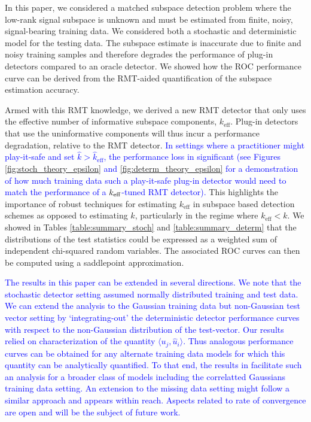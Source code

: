 In this paper, we considered a matched subspace detection problem where the low-rank signal subspace is unknown and must be estimated from finite, noisy, signal-bearing training data. We considered both a stochastic and deterministic model for the testing data. The subspace estimate is inaccurate due to finite and noisy training samples and therefore degrades the performance of plug-in detectors compared to an oracle detector. We showed how the ROC performance curve can be derived from the RMT-aided quantification of the subspace estimation accuracy.

Armed with this RMT knowledge, we derived a new RMT detector that only uses the effective number of informative subspace components, $k_\text{eff}$. Plug-in detectors that use the uninformative components will thus incur a performance degradation, relative to the RMT detector. \textcolor{blue}{In settings where a practitioner might play-it-safe and set $\widehat{k}> \widehat{k}_{\text{eff}}$, the performance loss in significant (see Figures \ref{fig:stoch_theory_epsilon} and \ref{fig:determ_theory_epsilon} for a demonstration of how much training data such a play-it-safe plug-in detector would need to match the performance of a $k_\text{eff}$-tuned RMT detector).} This highlights the importance of robust techniques \cite{nadakuditi2010fundamental,johnstone2001distribution,el2007tracy} for estimating $k_\text{eff}$ in subspace based detection schemes as opposed to estimating $k$, particularly in the regime where $k_{\text{eff}} < k$.  We showed in Tables \ref{table:summary_stoch} and \ref{table:summary_determ} that the distributions of the test statistics could be expressed as a weighted sum of independent chi-squared random variables. The associated ROC curves can then be computed using a saddlepoint approximation.

\textcolor{blue}{The results in this paper can be extended in several directions. We note that the stochastic detector setting assumed normally distributed training and test data. We can extend the analysis to the Gaussian training data but non-Gaussian test vector setting by `integrating-out' the deterministic detector performance curves with respect to the non-Gaussian distribution of the test-vector. Our results relied on characterization of the quantity $\langle u_{j},\widehat{u}_{i}\rangle$.  Thus analogous performance curves can be obtained for any alternate training data models for which this quantity can be analytically quantified. To that end, the results in \cite{benaych2011singular} facilitate such an analysis for a broader class of models including the correlatted Gaussians training data setting. An extension to the missing data setting might follow a similar approach and appears within reach. Aspects related to rate of convergence are open and will be the subject of future work.}

